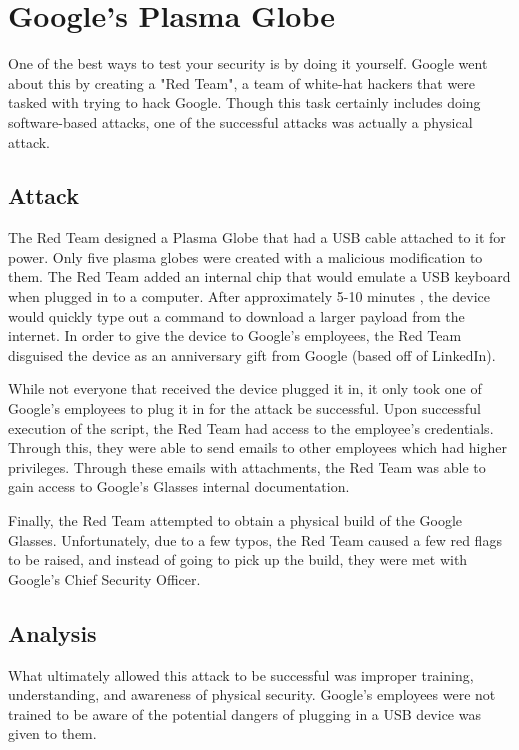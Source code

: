 \documentclass[acmsmall]{acmart}
\begin{document}
\section{Google's Plasma Globe \texorpdfstring{\cite{Google01}}{}}
One of the best ways to test your security is by doing it yourself. Google
went about this by creating a "Red Team", a team of white-hat hackers that
were tasked with trying to hack Google. Though this task certainly includes
doing software-based attacks, one of the successful attacks was actually
a physical attack.

\subsection{Attack}
The Red Team designed a Plasma Globe that had a USB cable attached to it for power.
Only five plasma globes were created with a malicious modification to them.
The Red Team added an internal chip that would emulate a USB keyboard when plugged
in to a computer. After approximately 5-10 minutes \cite{lcamtuf}, the device
would quickly type out a command to download a larger payload from the internet.
In order to give the device to Google's employees, the Red Team disguised the
device as an anniversary gift from Google (based off of LinkedIn).

While not everyone that received the device plugged it in, it only took one of
Google's employees to plug it in for the attack be successful. Upon successful
execution of the script, the Red Team had access to the employee's credentials.
Through this, they were able to send emails to other employees which had higher
privileges. Through these emails with attachments, the Red Team was able to
gain access to Google's Glasses internal documentation.

Finally, the Red Team attempted to obtain a physical build of the Google Glasses.
Unfortunately, due to a few typos, the Red Team caused a few red flags to be raised,
and instead of going to pick up the build, they were met with Google's Chief Security
Officer.

\subsection{Analysis}
What ultimately allowed this attack to be successful was improper training, understanding,
and awareness of physical security. Google's employees were not trained to be aware
of the potential dangers of plugging in a USB device was given to them.
\end{document}
